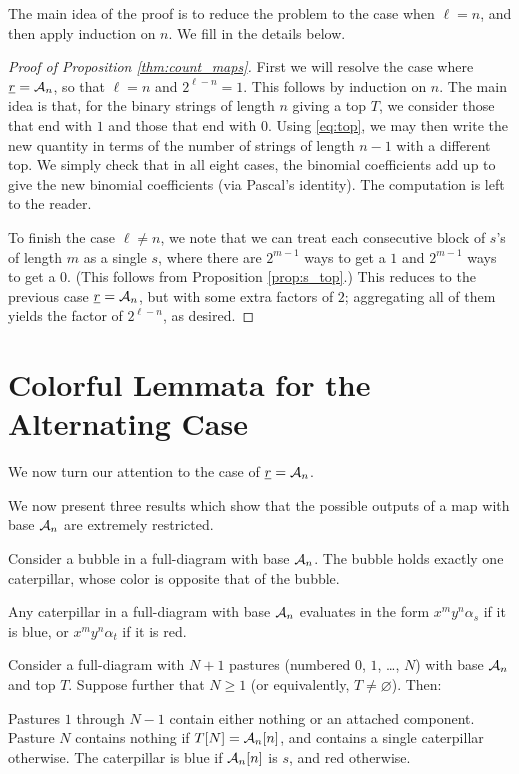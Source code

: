 The main idea of the proof is to reduce the problem to the case when $\ell = n$, and then apply induction on $n$.  We fill in the details below.

\begin{proof}[Proof of Proposition \ref{thm:count_maps}]
	First we will resolve the case where $\ul r = \AA_n$, so that $\ell = n$ and $2^{\ell-n} = 1$.  This follows by induction on $n$.  The main idea is that, for the binary strings of length $n$ giving a top $T$, we consider those that end with $1$ and those that end with $0$.  Using \eqref{eq:top}, we may then write the new quantity in terms of the number of strings of length $n-1$ with a different top.
	We simply check that in all eight cases, the binomial coefficients add up to give the new binomial coefficients (via Pascal's identity).  The computation is left to the reader.

	To finish the case $\ell \neq n$, we note that we can treat each consecutive block of $s$'s of length $m$ as a single $s$, where there are $2^{m-1}$ ways to get a $1$ and $2^{m-1}$ ways to get a $0$.  (This follows from Proposition \ref{prop:s_top}.)  This reduces to the previous case $\ul r = \AA_n$, but with some extra factors of $2$; aggregating all of them yields the factor of $2^{\ell-n}$, as desired.
\end{proof}

\section{Colorful Lemmata for the Alternating Case}
\label{sec:res_alt_restrict}
We now turn our attention to the case of $\ul r = \AA_n$.

We now present three results which show that the possible outputs of a map with base $\AA_n$ are extremely restricted.  
\begin{lemma}
	Consider a bubble in a full-diagram with base $\AA_n$.  The bubble holds exactly one caterpillar, whose color is opposite that of the bubble.
	\label{thm:bubble}
\end{lemma}
\begin{lemma}
	Any caterpillar in a full-diagram with base $\AA_n$ evaluates in the form $x^my^n\alpha_s$ if it is blue, or $x^my^n\alpha_t$ if it is red.
	\label{thm:caterpillar}
\end{lemma}
\begin{lemma}
	Consider a full-diagram with $N+1$ pastures (numbered $0$, $1$, \dots, $N$) with base $\AA_n$ and top $T$.  Suppose further that $N \ge 1$ (or equivalently, $T \neq \varnothing$).  Then:
	\begin{enumerate}[(i)]
		\ii Pastures $1$ through $N-1$ contain either nothing or an attached component.
		\ii Pasture $N$ contains nothing if $T[N] = \AA_n[n]$, and contains a single caterpillar otherwise.  The caterpillar is blue if $\AA_n[n]$ is $s$, and red otherwise.
	\end{enumerate}
	\label{thm:pasture}
\end{lemma}

